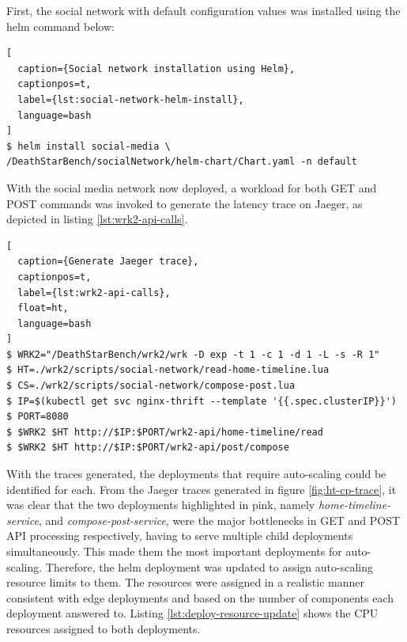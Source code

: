 First, the social network with default configuration values was installed using the helm command below:

\begin{lstlisting}[
  caption={Social network installation using Helm},
  captionpos=t,
  label={lst:social-network-helm-install},
  language=bash
]
$ helm install social-media \
/DeathStarBench/socialNetwork/helm-chart/Chart.yaml -n default
\end{lstlisting}

With the social media network now deployed, a workload for both GET and POST commands was invoked to generate the latency trace on Jaeger, as depicted in listing \ref{lst:wrk2-api-calls}.

\begin{lstlisting}[
  caption={Generate Jaeger trace},
  captionpos=t,
  label={lst:wrk2-api-calls},
  float=ht,
  language=bash
]
$ WRK2="/DeathStarBench/wrk2/wrk -D exp -t 1 -c 1 -d 1 -L -s -R 1"
$ HT=./wrk2/scripts/social-network/read-home-timeline.lua
$ CS=./wrk2/scripts/social-network/compose-post.lua
$ IP=$(kubectl get svc nginx-thrift --template '{{.spec.clusterIP}}')
$ PORT=8080
$ $WRK2 $HT http://$IP:$PORT/wrk2-api/home-timeline/read
$ $WRK2 $HT http://$IP:$PORT/wrk2-api/post/compose
\end{lstlisting}

With the traces generated, the deployments that require auto-scaling could be identified for each. From the Jaeger traces generated in figure \ref{fig:ht-cp-trace}, it was clear that the two deployments highlighted in pink, namely \textit{home-timeline-service}, and \textit{compose-post-service}, were the major bottlenecks in GET and POST API processing respectively, having to serve multiple child deployments simultaneously. This made them the most important deployments for auto-scaling. Therefore, the helm deployment was updated to assign auto-scaling resource limits to them. The resources were assigned in a realistic manner consistent with edge deployments and based on the number of components each deployment answered to. Listing \ref{lst:deploy-resource-update} shows the CPU resources assigned to both deployments.\par

